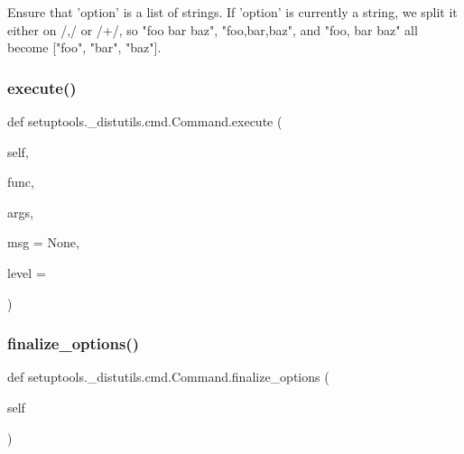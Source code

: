 \begin{DoxyVerb}Ensure that 'option' is a list of strings.  If 'option' is
currently a string, we split it either on /,\s*/ or /\s+/, so
"foo bar baz", "foo,bar,baz", and "foo,   bar baz" all become
["foo", "bar", "baz"].
\end{DoxyVerb}
 \mbox{\label{classsetuptools_1_1__distutils_1_1cmd_1_1Command_aa15b5cefcab5f7c3de4f87976d647744}} 
\subsubsection{\texorpdfstring{execute()}{execute()}}
{\footnotesize\ttfamily def setuptools.\+\_\+distutils.\+cmd.\+Command.\+execute (\begin{DoxyParamCaption}\item[{}]{self,  }\item[{}]{func,  }\item[{}]{args,  }\item[{}]{msg = {\ttfamily None},  }\item[{}]{level = {} }\end{DoxyParamCaption})}

\mbox{\label{classsetuptools_1_1__distutils_1_1cmd_1_1Command_a55932706ffef946f45869f80f6073c7f}} 
\subsubsection{\texorpdfstring{finalize\+\_\+options()}{finalize\_options()}}
{\footnotesize\ttfamily def setuptools.\+\_\+distutils.\+cmd.\+Command.\+finalize\+\_\+options (\begin{DoxyParamCaption}\item[{}]{self }\end{DoxyParamCaption})}

